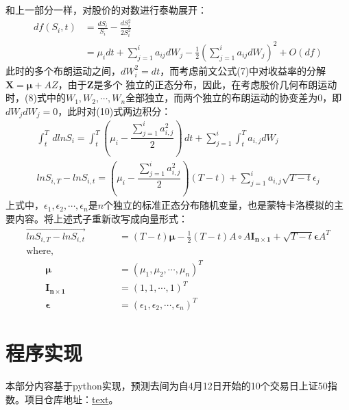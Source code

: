 \documentclass{article}
\begin{document}
    \qquad 和上一部分一样，对股价的对数进行泰勒展开：
    \begin{align}
        df(S_i,t)&=\frac{dS_i}{S_i}-\frac{dS_i^2}{2S_i^2}\nonumber\\
        &=\mu_i dt+\sum_{j=1}^{i}a_{ij}dW_{j}-\frac{1}{2}\left(\sum_{j=1}^{i}a_{ij}dW_{j}\right)^2+O(df)
    \end{align}
    \qquad 此时的多个布朗运动之间，$dW_i^2=dt$，而考虑前文公式(7)中对收益率的分解$\boldsymbol{X} = \boldsymbol{\mu}+AZ$，由于$\boldsymbol{Z}$是多个
    独立的正态分布，因此，在考虑股价几何布朗运动时，(8)式中的$W_1,W_2,\cdots,W_n$全部独立，而两个独立的布朗运动的协变差为0，即$dW_jdW_j=0$，此时对(10)式两边积分：
    \begin{gather}
        \int_{t}^{T}\,dlnS_i=\int_{t}^{T}(\mu_i-\dfrac{\sum_{j=1}^{i}a_{i,j}^2}{2})\,dt+\sum_{j=1}^{i}\int_{t}^{T}a_{i,j} dW_j\\
        lnS_{i,T}-lnS_{i,t}=(\mu_i-\dfrac{\sum_{j=1}^{i}a_{i,j}^2}{2})(T-t)+\sum_{j=1}^{i}a_{i,j}\sqrt{T-t}\epsilon_j 
    \end{gather}
    \qquad 上式中，$\epsilon_1,\epsilon_2,\cdots,\epsilon_n$是$n$个独立的标准正态分布随机变量，也是蒙特卡洛模拟的主要内容。将上述式子重新改写成向量形式：
    \begin{align}
        \overrightarrow{lnS_{i,T}-lnS_{i,t}}&=(T-t)\boldsymbol{\mu}-\frac{1}{2}(T-t)A\circ A\boldsymbol{I_{n\times 1}}+\sqrt{T-t}\boldsymbol{\epsilon}A^T\\
        \text{where,}\qquad\qquad\qquad\nonumber\\
        \qquad\boldsymbol{\mu}&= (\mu_1,\mu_2,\cdots,\mu_n)^T\nonumber\\
        \qquad\boldsymbol{I_{n\times1}}&= (1,1,\cdots,1)^T\nonumber\\
        \qquad\boldsymbol{\epsilon}&= (\epsilon_1,\epsilon_2,\cdots,\epsilon_n)^T\nonumber
    \end{align}
    \section{程序实现}
    \qquad 本部分内容基于python实现，预测去间为自4月12日开始的10个交易日上证50指数。项目仓库地址：\href{URL}{text}。
\end{document}
